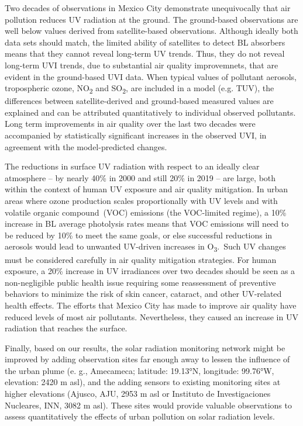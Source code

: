 \documentclass[journal=jacsat,manuscript=article]{achemso}
\begin{document}
Two decades of observations in Mexico City demonstrate unequivocally
that air pollution reduces UV radiation at the ground. The ground-based
observations are well below values derived from satellite-based
observations. Although ideally both data sets should match,
the limited ability of satellites to detect BL absorbers means that they cannot reveal long-term UV trends.
Thus, they do not reveal long-term UVI trends, due to substantial air quality improvemnets, that are evident in the ground-based UVI data.
When typical values of pollutant aerosols,
tropospheric ozone, NO\textsubscript{2}
and SO\textsubscript{2}, are included in a model (e.g. TUV), the
differences between satellite-derived and ground-based measured values
are explained and can be attributed quantitatively to individual
observed pollutants. Long term improvements in air quality over the last two decades
were accompanied by statistically significant increases in the
observed UVI, in agreement with the model-predicted changes.

The reductions in surface UV radiation with respect to an ideally clear
atmosphere -- by nearly 40\% in 2000 and still 20\% in 2019 -- are
large, both within the context of human UV exposure and air quality
mitigation. In urban areas where ozone production scales proportionally
with UV levels and with volatile organic compound~(VOC) emissions (the
VOC-limited regime), a 10\% increase in BL average photolysis rates
means that VOC emissions will need to be reduced by 10\% to meet the
same goals, or else successful reductions in aerosols would lead to
unwanted UV-driven increases in O\textsubscript{3}.~Such UV changes must
be considered carefully in air quality mitigation strategies. For human
exposure, a 20\% increase in UV irradiances over two decades should be
seen as a non-negligible public health issue requiring some reassessment
of preventive behaviors to minimize the risk of skin cancer, cataract,
and other UV-related health effects. The efforts that Mexico City has
made to improve air quality have reduced levels
of most air pollutants. Nevertheless, they caused an increase in UV
radiation that reaches the surface.

Finally, based on our results, the solar radiation monitoring network might
be improved by adding observation sites far enough away to lessen the
influence of the urban plume (e. g., Amecameca; latitude: 19.13°N, longitude: 99.76°W, elevation: 2420 m asl),
and the adding sensors to existing monitoring sites at higher elevations
(Ajusco, AJU, 2953 m asl or Instituto de Investigaciones Nucleares, INN, 3082 m asl).
These sites would provide valuable observations to assess quantitatively the effects of urban pollution on solar radiation levels.
\end{document}
